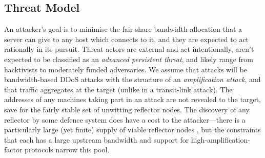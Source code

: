 \documentclass[conference, letterpaper, 10pt, times]{IEEEtran}
\begin{document}
%

\subsection{Threat Model}


An attacker's goal is to minimise the fair-share bandwidth allocation that a server can give to any host which connects to it, and they are expected to act rationally in its pursuit.
Threat actors are external and act intentionally, aren't expected to be classified as an \emph{advanced persistent threat}, and likely range from hacktivists to moderately funded adversaries.
We assume that attacks will be bandwidth-based DDoS attacks with the structure of an \emph{amplification attack}, and that traffic aggregates at the target (unlike in a transit-link attack).
The addresses of any machines taking part in an attack are not revealed to the target, save for the fairly stable set of unwitting reflector nodes.
The discovery of any reflector by some defence system does have a cost to the attacker---there is a particularly large (yet finite) supply of viable reflector nodes \cite{DBLP:conf/ndss/Rossow14}, but the constraints that each has a large upstream bandwidth and support for high-amplification-factor protocols narrow this pool.
\end{document}

